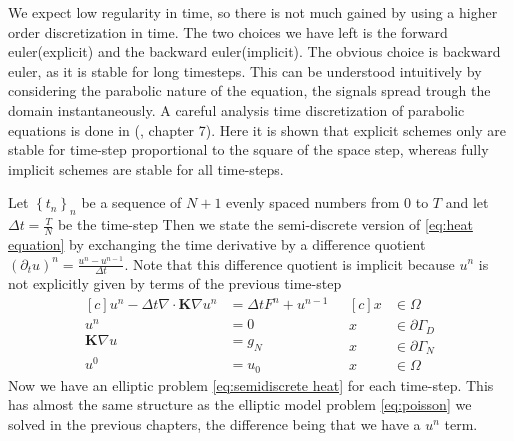 \documentclass[../Main/main.tex]{subfiles}
\begin{document}
	We expect low regularity in time, so there is not much gained by using a higher order discretization in time. The two choices we have left is the forward euler(explicit) and the backward euler(implicit). The obvious choice is backward euler, as it is stable for long timesteps. This can be understood intuitively by considering the parabolic nature of the equation, the signals spread trough the domain instantaneously. A careful analysis time discretization of parabolic equations is done in (\cite{Knabner}, chapter 7).  Here it is shown that explicit schemes only are stable for time-step proportional to the square of the space step, whereas fully implicit schemes are stable for all time-steps. \par  Let $\left \{ t_n \right \}_n$ be a sequence of $N+1$ evenly spaced numbers from $0$ to $T$ and let $\Delta t = \frac{T}{N}$ be the time-step Then we state the semi-discrete version of \eqref{eq:heat equation} by exchanging the time derivative by a difference quotient $(\partial_t u)^n = \frac{u^n-u^{n-1}}{\Delta t}$. Note that this difference quotient is implicit because $u^n$ is not explicitly given by terms of the previous time-step
	\begin{equation}\label{eq:semidiscrete heat}
		\begin{aligned}[c]
			u^n - \Delta t \nabla \cdot \pmb{K} \nabla u^n &= \Delta t F^n+u^{n-1}\\
			u^n &= 0 \\
			\pmb{K}\nabla u &= g_N\\
			u^0 &= u_0
		\end{aligned}
		\ \ \
		\begin{aligned}[c]
			x &\in \Omega  \\
			x &\in \partial \Gamma_D \\
			x &\in \partial \Gamma_N \\
			x &\in \Omega  
		\end{aligned}
	\end{equation}
	Now we have an elliptic problem \eqref{eq:semidiscrete heat} for each time-step. This has almost the same structure as the elliptic model problem \eqref{eq:poisson} we solved in the previous chapters, the difference being that we have a $u^n$ term.
\end{document}
